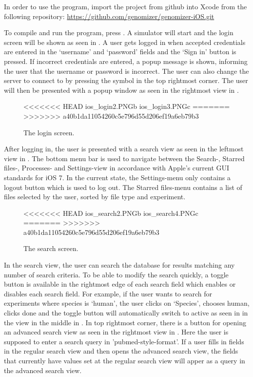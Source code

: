 In order to use the program, import the project from github into Xcode from the following repository:
\url{https://github.com/genomizer/genomizer-iOS.git} 

To compile and run the program, press . A simulator will start and the login screen will be shown as seen in . A user gets logged in when accepted credentials are entered in the ‘username’ and ‘password’ fields and the ‘Sign in’ button is pressed. If incorrect credentials are entered, a popup message is shown, informing the user that the username or password is incorrect. The user can also change  the server to connect to by pressing the symbol in the top rightmost corner. The user will then be presented with a popup window as seen in the rightmost view in .

\begin{figure}[ht]
<<<<<<< HEAD
		{ios_login2.PNG}{b}
		{ios_login3.PNG}{c}
=======
>>>>>>> a40b1da11054260c5e796d55d206ef19a6eb79b3
\caption{The login screen.}
\label{fig:ios_login}
\end{figure}
\FloatBarrier
After logging in, the user is presented with a search view as seen in the leftmost view in . The bottom menu bar is used to navigate between the Search-, Starred files-, Processes- and Settings-view in accordance with Apple's current GUI standards for iOS 7. In the current state, the Settings-menu only contains a logout button which is used to log out. The Starred files-menu contains a list of files selected by the user, sorted by file type and experiment.
\begin{figure}[ht]
<<<<<<< HEAD
		{ios_search2.PNG}{b}
		{ios_search4.PNG}{c}
=======
>>>>>>> a40b1da11054260c5e796d55d206ef19a6eb79b3
\caption{The search screen.}
\label{fig:ios_search}
\end{figure}
\FloatBarrier
In the search view, the user can search the database for results matching any number of search criteria. To be able to modify the search quickly, a toggle button is available in the rightmost edge of each search field which enables or disables each search field. For example, if the user wants to search for experiments where species is ‘human’, the user clicks on ‘Species’, chooses human, clicks done and the toggle button will automatically switch to active as seen in in the view in the middle in .
In top rightmost corner, there is a button for opening an advanced search view as seen in the rightmost view in . Here the user is supposed to enter a search query in ’pubmed-style-format’. If a user fills in fields in the regular search view and then opens the advanced search view, the fields that currently have values set at the regular search view will apper as a query in the advanced search view.

